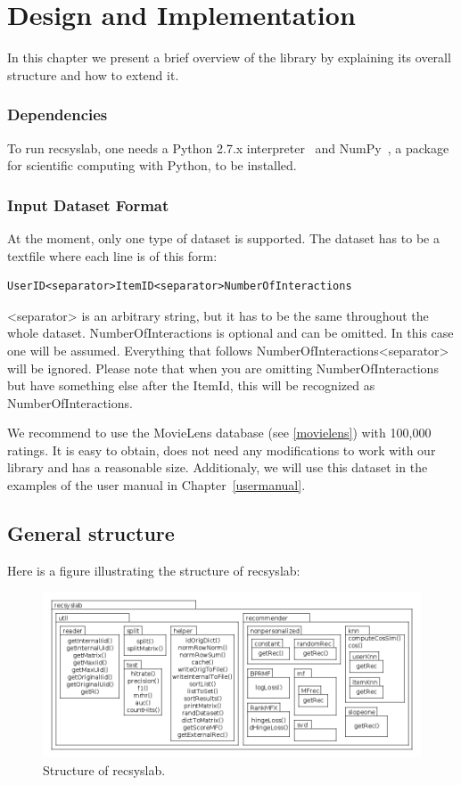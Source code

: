 
\chapter{Design and Implementation}
\label{design}
In this chapter we present a brief overview of the library
by explaining its overall structure and how to extend it.

\subsection*{Dependencies}
To run recsyslab, one needs a Python 2.7.x interpreter~\cite{python} and NumPy~\cite{numpy},
a package for scientific computing with Python, to be installed.

\subsection*{Input Dataset Format}
At the moment, only one type of dataset is supported. The dataset has to be
a textfile where each line is of this form:

\begin{lstlisting}
UserID<separator>ItemID<separator>NumberOfInteractions
\end{lstlisting}

<separator> is an arbitrary string, but it has to be the same throughout the whole dataset.
NumberOfInteractions is optional and can be omitted. In this case one will be assumed.
Everything that follows NumberOfInteractions<separator> will be ignored.
Please note that when you are omitting NumberOfInteractions but have something else after
the ItemId, this will be recognized as NumberOfInteractions.

We recommend to use the MovieLens database (see \ref{movielens}) with 100,000 ratings.
It is easy to obtain, does not need any modifications to work with our library and has a
reasonable size. Additionaly, we will use this dataset in the examples of the user manual in 
Chapter~\ref{usermanual}.

%
\pagebreak
\section{General structure}
Here is a figure illustrating the structure of recsyslab:

\begin{figure}[H]
\includegraphics[scale=0.4]{packagediagram.png}
\caption{Structure of recsyslab.}
\end{figure}


